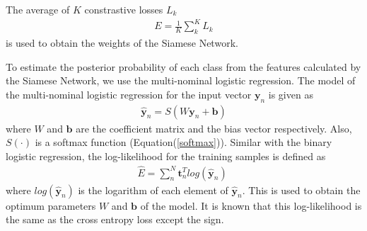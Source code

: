 \documentclass[a4paper,12pt]{article}
\begin{document}
The average of $K$ constrastive losses $L_k$  
\begin{align} \label{eq:ave contrastive}
E = \frac{1}{K}\sum_{k}^{K}L_k
\end{align}
is used to obtain the weights of the Siamese Network.

To estimate the posterior probability of each class from the features calculated by the Siamese Network, we use the multi-nominal logistic regression.
The model of the multi-nominal logistic regression for the input vector $\bm{y}_n$ is given as
\begin{align} \label{eq:regression multi}
    \hat{\bm y}_n = S(W\bm{y}_n+\bm{b})
\end{align}
where $W$ and $\bm{b}$ are the coefficient matrix and the bias vector respectively.
Also, $S(\cdot)$ is a softmax function (Equation(\ref{softmax})).
Similar with the binary logistic regression, the log-likelihood for the training samples is defined as
\begin{align} \label{eq:multi crossentropy}
\hat{E} = \sum_n^N {\bm t}_n^Tlog(\hat{\bm y}_n) \; 
\end{align}
where $log(\hat{\bm y}_n)$ is the logarithm of each element of $\hat{\bm y}_n$. 
This is used to obtain the optimum parameters $W$ and $\bm{b}$ of the model.
It is known that this log-likelihood is the same as the cross entropy loss except the sign.
\end{document}
